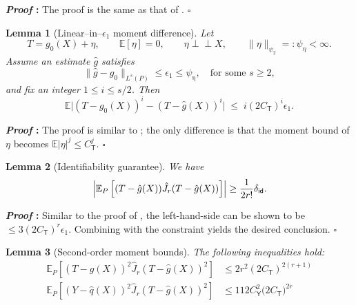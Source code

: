 \documentclass{article}
\def\eps{{\epsilon}}
\newcommand{\E}{\mathbb{E}}
\newtheorem{lemma}{Lemma}[section]
\renewenvironment{proof}{\noindent\textbf{\textit{Proof }:}}{\hfill$\square$}
\newcommand{\ind}{\perp\!\!\!\!\perp}
\begin{document}
\begin{proof}
    The proof is the same as that of .
\end{proof}

\begin{lemma}[Linear–in–$\epsilon_1$ moment difference]\label{lem:lin-eps1-general}
Let  
\[
T=g_0(X)+\eta,\qquad \E[\eta]=0,\qquad 
\eta \ind X,\qquad 
\|\eta\|_{\psi_2}=:\psi_\eta<\infty.
\]
Assume an estimate $\hat g$ satisfies  
\[
\|\hat g-g_0\|_{L^{s}(P)}\le \eps_1 \leq \psi_{\upeta},
\quad\text{for some }s\ge 2,
\]
and fix an integer $1\le i\le s/2$.   
Then  
\begin{equation}\label{eq:lin-main-general}
\E\bigl|(T-g_0(X))^{i}-(T-\hat g(X))^{i}\bigr|
  \;\le\;
 i(2C_{\mathsf{T}})^i\eps_1.
\end{equation}
\end{lemma}

\begin{proof}
    The proof is similar to ; the only difference is that the moment bound of $\eta$ becomes $\E|\eta|^j \leq C_{\mathsf{T}}^j$.
\end{proof}

\begin{lemma}[Identifiability guarantee]
    \label{lemma:independent-noise-identification-general}
    We have
    \begin{equation}
        \notag
        \left|\E_{P}\left[ (T-\hat{g}(X))\hat{J}_r(T-\hat{g}(X)) \right]\right| \geq \frac{1}{2r!} \delta_{\mathsf{id}}.
    \end{equation}
\end{lemma}

\begin{proof}
    Similar to the proof of , the left-hand-side can be shown to be $\leq 3(2C_{\mathsf{T}})^r\eps_1$. Combining with the constraint  yields the desired conclusion.
\end{proof}

\begin{lemma}[Second-order moment bounds]
\label{lemma:var-bound-general}
    The following inequalities hold:
    \begin{align}
        \E_{P}\left[ (T-\hat{g}(X))^2\hat{J}_r(T-\hat{g}(X))^2 \right] &\leq 2r^2 (2C_{\mathsf{T}})^{2(r+1)} \label{eq:var-bound-T-general} \\
        \E_{P}\left[ (Y-\hat{q}(X))^2\hat{J}_r(T-\hat{g}(X))^2 \right] & \leq 112 C_{\mathsf{Y}}^2\big(2C_{\mathsf{T}}\big)^{2r} \label{eq:var-bound-Y-general}
    \end{align}
\end{lemma}
\end{document}
